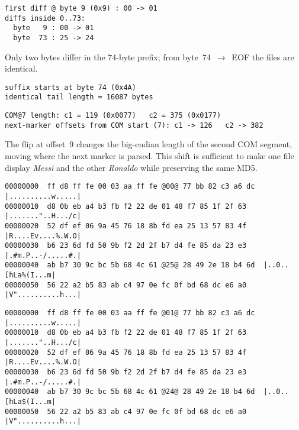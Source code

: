 \documentclass[runningheads]{llncs}
\begin{document}
    \begin{lstlisting}[style=textblock,
        caption={First difference \& prefix flips},
        label={lst:firstdiff}]
first diff @ byte 9 (0x9) : 00 -> 01
diffs inside 0..73:
  byte   9 : 00 -> 01
  byte  73 : 25 -> 24
    \end{lstlisting}

    Only two bytes differ in the 74-byte prefix; from byte~74~$\rightarrow$~EOF the files are identical.

    \begin{lstlisting}[style=textblock,
        caption={Identical suffix boundary \& length},
        label={lst:suffix}]
suffix starts at byte 74 (0x4A)
identical tail length = 16087 bytes
    \end{lstlisting}

    \begin{lstlisting}[style=textblock,
        caption={Steering flip (2nd COM length) and next-marker offsets},
        label={lst:comlength}]
COM@7 length: c1 = 119 (0x0077)   c2 = 375 (0x0177)
next-marker offsets from COM start (7): c1 -> 126   c2 -> 382
    \end{lstlisting}

    The flip at offset~9 changes the big-endian length of the second COM segment, moving where the next marker is parsed. This shift is sufficient to make one file display \emph{Messi} and the other \emph{Ronaldo} while preserving the same MD5.

    \begin{lstlisting}[style=hexhi,caption={collision1.jpg — first 96 bytes}]
00000000  ff d8 ff fe 00 03 aa ff fe @00@ 77 bb 82 c3 a6 dc  |..........w.....|
00000010  d8 0b eb a4 b3 fb f2 22 de 01 48 f7 85 1f 2f 63  |......."..H.../c|
00000020  52 df ef 06 9a 45 76 18 8b fd ea 25 13 57 83 4f  |R....Ev....%.W.O|
00000030  b6 23 6d fd 50 9b f2 2d 2f b7 d4 fe 85 da 23 e3  |.#m.P..-/.....#.|
00000040  ab b7 30 9c bc 5b 68 4c 61 @25@ 28 49 2e 18 b4 6d  |..0..[hLa%(I...m|
00000050  56 22 a2 b5 83 ab c4 97 0e fc 0f bd 68 dc e6 a0  |V"..........h...|
    \end{lstlisting}

    \begin{lstlisting}[style=hexhi,caption={collision1.jpg — first 96 bytes}]
00000000  ff d8 ff fe 00 03 aa ff fe @01@ 77 bb 82 c3 a6 dc  |..........w.....|
00000010  d8 0b eb a4 b3 fb f2 22 de 01 48 f7 85 1f 2f 63  |......."..H.../c|
00000020  52 df ef 06 9a 45 76 18 8b fd ea 25 13 57 83 4f  |R....Ev....%.W.O|
00000030  b6 23 6d fd 50 9b f2 2d 2f b7 d4 fe 85 da 23 e3  |.#m.P..-/.....#.|
00000040  ab b7 30 9c bc 5b 68 4c 61 @24@ 28 49 2e 18 b4 6d  |..0..[hLa$(I...m|
00000050  56 22 a2 b5 83 ab c4 97 0e fc 0f bd 68 dc e6 a0  |V"..........h...|
    \end{lstlisting}
\end{document}
